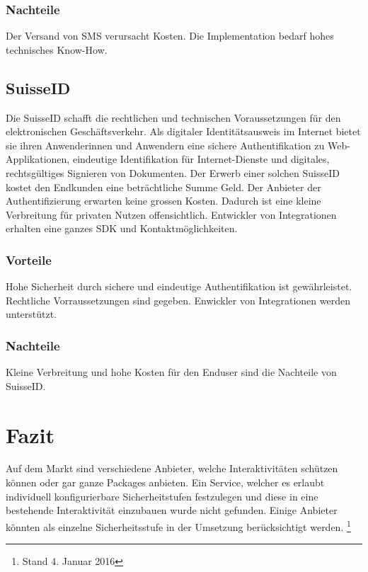 \subsubsection{Nachteile}\label{nachteile-2}

Der Versand von SMS verursacht Kosten. Die Implementation bedarf hohes
technisches Know-How.

\hypertarget{suisseid}{\subsection{SuisseID}\label{suisseid}}

Die SuisseID schafft die rechtlichen und technischen Voraussetzungen für
den elektronischen Geschäftsverkehr. Als digitaler Identitätsausweis im
Internet bietet sie ihren Anwenderinnen und Anwendern eine sichere
Authentifikation zu Web-Applikationen, eindeutige Identifikation für
Internet-Dienste und digitales, rechtsgültiges Signieren von Dokumenten.
Der Erwerb einer solchen SuisseID kostet den Endkunden eine
beträchtliche Summe Geld. Der Anbieter der Authentifizierung erwarten
keine grossen Kosten. Dadurch ist eine kleine Verbreitung für privaten
Nutzen offensichtlich. Entwickler von Integrationen erhalten eine ganzes
SDK und Kontaktmöglichkeiten.

\subsubsection{Vorteile}\label{vorteile-3}

Hohe Sicherheit durch sichere und eindeutige Authentifikation ist
gewährleistet. Rechtliche Vorraussetzungen sind gegeben. Enwickler von
Integrationen werden unterstützt.

\subsubsection{Nachteile}\label{nachteile-3}

Kleine Verbreitung und hohe Kosten für den Enduser sind die Nachteile
von SuisseID.

\section{Fazit}\label{fazit}

Auf dem Markt sind verschiedene Anbieter, welche Interaktivitäten
schützen können oder gar ganze Packages anbieten. Ein Service, welcher
es erlaubt individuell konfigurierbare Sicherheitstufen festzulegen und
diese in eine bestehende Interaktivität einzubauen wurde nicht gefunden.
Einige Anbieter könnten als einzelne Sicherheitsstufe in der Umsetzung
berücksichtigt werden. \footnote{Stand 4. Januar 2016}

